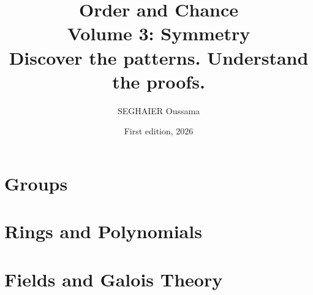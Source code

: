 \documentclass[11pt,openany]{book}
\title{\Huge\textbf{Order and Chance}\\[0.4em]\LARGE Volume 3: Symmetry\\[0.6em]
\Large Discover the patterns. Understand the proofs.}
\author{SEGHAIER Oussama}
\date{First edition, 2026}
\begin{document}
\frontmatter
\makecover
\maketitle

\tableofcontents

\mainmatter

\part{Groups}





\part{Rings and Polynomials}



\part{Fields and Galois Theory}





\appendix














\end{document}
